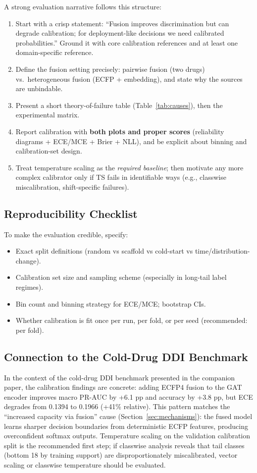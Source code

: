 \documentclass[11pt,a4paper,twocolumn]{article}
\begin{document}
A strong evaluation narrative follows this structure:
\begin{enumerate}
\item Start with a crisp statement: ``Fusion improves discrimination but
      can degrade calibration; for deployment-like decisions we need
      calibrated probabilities.'' Ground it with core calibration references
      and at least one domain-specific reference.
\item Define the fusion setting precisely: pairwise fusion (two drugs) vs.\
      heterogeneous fusion (ECFP + embedding), and state why the sources
      are unbindable.
\item Present a short theory-of-failure table (Table~\ref{tab:causes}),
      then the experimental matrix.
\item Report calibration with \textbf{both plots and proper scores}
      (reliability diagrams + ECE/MCE + Brier + NLL), and be explicit
      about binning and calibration-set design.
\item Treat temperature scaling as the \textit{required baseline}; then
      motivate any more complex calibrator only if TS fails in identifiable
      ways (e.g., classwise miscalibration, shift-specific failures).
\end{enumerate}

\subsection{Reproducibility Checklist}
To make the evaluation credible, specify:
\begin{itemize}
\item Exact split definitions (random vs scaffold vs cold-start vs
      time/distribution-change).
\item Calibration set size and sampling scheme (especially in long-tail
      label regimes).
\item Bin count and binning strategy for ECE/MCE; bootstrap CIs.
\item Whether calibration is fit once per run, per fold, or per seed
      (recommended: per fold).
\end{itemize}

\subsection{Connection to the Cold-Drug DDI Benchmark}
In the context of the cold-drug DDI benchmark presented in the companion
paper, the calibration findings are concrete: adding ECFP4 fusion to the
GAT encoder improves macro PR-AUC by +6.1 pp and accuracy by +3.8 pp,
but ECE degrades from 0.1394 to 0.1966 (+41\% relative).
This pattern matches the ``increased capacity via fusion'' cause
(Section~\ref{sec:mechanisms}): the fused model learns sharper decision
boundaries from deterministic ECFP features, producing overconfident
softmax outputs.
Temperature scaling on the validation calibration split is the
recommended first step; if classwise analysis reveals that tail classes
(bottom 18 by training support) are disproportionately miscalibrated,
vector scaling or classwise temperature should be evaluated.
\end{document}
